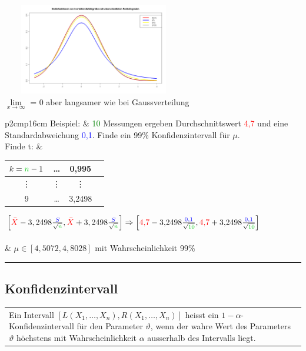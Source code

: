 	\begin{minipage}{10cm}
   		\includegraphics[width=8cm,height=4cm]{./bilder/T-Verteilung.png}\\
		$\lim\limits_{x\rightarrow \infty}$ = 0 aber langsamer wie bei
		Gaussverteilung 
    \end{minipage}

		\begin{tabular}{p{2cm}p{16cm}}
        Beispiel: & \textcolor{green}{10} Messungen ergeben Durchschnittswert
        \textcolor{red}{4{,}7} und eine Standardabweichung \textcolor{blue}{0{,}1}.
        Finde ein 99\%  Konfidenzintervall für $\mu$.\\
        
         Finde t: & \begin{tabular}{| c | c | c | c |}
                   \hline
                   $k=\textcolor{green}{n}-1$ & \ldots & 0{,}995\\
                   \hline
                   \vdots & \vdots & \vdots \\
                   \hline
                   9 & \ldots & 3{,}2498\\
                   \hline
                   \end{tabular}
        
       		 $\left[\textcolor{red}{\bar{X}}-3,2498\frac{\textcolor{blue}{S}}{\sqrt{\textcolor{green}{n}}},
		\textcolor{red}{\bar{X}}+3,2498\frac{\textcolor{blue}{S}}{\sqrt{\textcolor{green}{n}}}\right]
		\Rightarrow 
		\left[{\color{red}4{,}7}-3{,}2498\frac{\textcolor{blue}{0{,}1}}{\sqrt{\textcolor{green}{10}}},
		\textcolor{red}{4{,}7}+3{,}2498\frac{\textcolor{blue}{0{,}1}}{\sqrt{\textcolor{green}{10}}}\right]$\\ \\
		& $\mu\in \left[4{,}5072, 4{,}8028\right]$ mit Wahrscheinlichkeit 99\%
        \end{tabular}
\hrule

	\subsection{Konfidenzintervall  }
	\begin{tabular}{p{18cm}}
     Ein Intervall $[L(X_1,\ldots,X_n),R(X_1,\ldots,X_n)]$ heisst ein
     $1-\alpha$- Konfidenzintervall für den Parameter $\vartheta$, wenn der wahre
     Wert des Parameters $\vartheta$ höchstens mit Wahrscheinlichkeit $\alpha$
     ausserhalb des Intervalls liegt.
    \end{tabular}\\